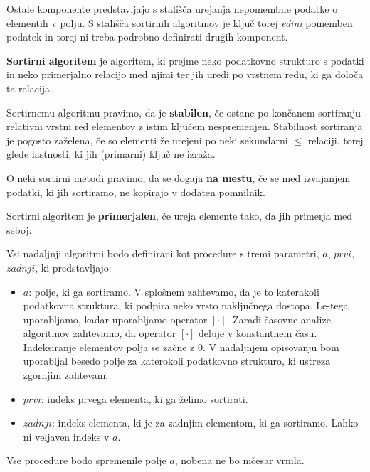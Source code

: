 \documentclass[a4paper,oneside]{article}
\begin{document}
Ostale komponente predstavljajo s stališča urejanja nepomembne podatke o elementih v
polju.
S stališča sortirnih algoritmov je ključ torej \emph{edini} pomemben podatek in torej ni treba
podrobno definirati drugih komponent.

\begin{definicija}
  \textbf{Sortirni algoritem} je algoritem, ki prejme neko podatkovno strukturo s podatki
  in neko primerjalno relacijo med njimi ter jih uredi po vrstnem redu, ki ga določa ta
  relacija.
\end{definicija}

\begin{definicija}
  Sortirnemu algoritmu pravimo, da je \textbf{stabilen}, če ostane po končanem sortiranju
  relativni vrstni red elementov z istim ključem nespremenjen.
  Stabilnost sortiranja je pogosto zaželena, če so elementi že urejeni po neki
  sekundarni $\leq$ relaciji, torej glede lastnosti, ki jih (primarni) ključ ne izraža.
\end{definicija}

\begin{definicija}
  O neki sortirni metodi pravimo, da se dogaja \textbf{na mestu}, če se med izvajanjem podatki, ki
  jih sortiramo, ne kopirajo v dodaten pomnilnik.
\end{definicija}

\begin{definicija}
  Sortirni algoritem je \textbf{primerjalen}, če ureja elemente tako, da jih primerja med seboj.
\end{definicija}


Vsi nadaljnji algoritmi bodo definirani kot procedure s tremi parametri, $a$, $prvi$,
$zadnji$, ki predstavljajo:
\begin{itemize}
  \item $a$: polje, ki ga sortiramo. V splošnem zahtevamo, da je to katerakoli podatkovna
    struktura, ki podpira neko vrsto naključnega dostopa. Le-tega uporabljamo, kadar 
    uporabljamo operator $[\cdot]$. Zaradi časovne analize algoritmov zahtevamo, da operator 
    $[\cdot]$ deluje v konstantnem času. Indeksiranje elementov polja se začne z 0.
    V nadaljnjem opisovanju bom uporabljal besedo
    polje za katerokoli podatkovno strukturo, ki ustreza zgornjim zahtevam.
  \item $prvi$: indeks prvega elementa, ki ga želimo sortirati.
  \item $zadnji$: indeks elementa, ki je za zadnjim elementom, ki ga sortiramo. Lahko ni
    veljaven indeks v $a$.
\end{itemize}
Vse procedure bodo spremenile polje $a$, nobena ne bo ničesar vrnila.
\end{document}
